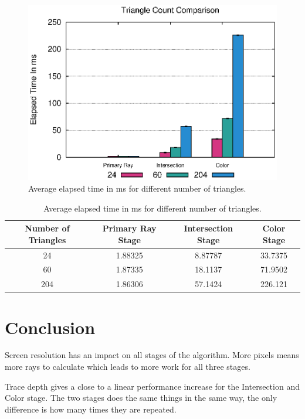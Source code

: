 \documentclass{article}
\begin{document}
\begin{figure}[h!tbp]
    \centering
    \includegraphics[width=1.0\columnwidth]{Figures/trianglecount.eps}
    \caption{Average elapsed time in ms for different number of triangles. \label{fig:trianglecount}}
\end{figure}

\begin{table}[h!btp]
\centering
\def\arraystretch{1.5}
\begin{tabular}{c|c|c|c}
Number of Triangles & Primary Ray Stage & Intersection Stage & Color Stage \\ [2pt]
\hline
24  & 1.88325 & 8.87787  & 33.7375 \\
\hline
60  & 1.87335 & 18.1137 & 71.9502 \\
\hline
204 & 1.86306 & 57.1424 & 226.121 \\
\hline
\end{tabular}
\caption{Average elapsed time in ms for different number of triangles. \label{tab:ResultsTriangleCount}}
\end{table}



\section{Conclusion}
\label{sec:Conclusion}

Screen resolution has an impact on all stages of the algorithm. More pixels means more rays to calculate which leads to
more work for all three stages.

Trace depth gives a close to a linear performance increase for the Intersection and Color stage. The two stages does the same things in the same way, the
only difference is how many times they are repeated.
\end{document}
